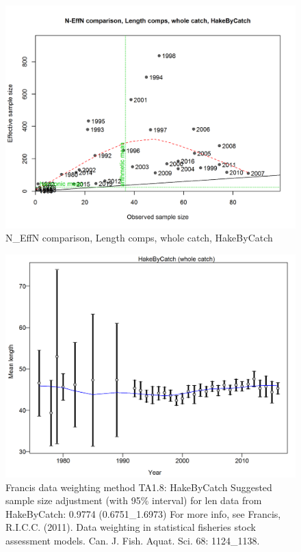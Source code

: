 \documentclass[12pt,]{article}
\begin{document}
\begin{figure}[htbp]
\centering
\includegraphics{./r4ss/plots_mod1/comp_lenfit_sampsize_flt2mkt0.png}
\caption{N\_EffN comparison, Length comps, whole catch, HakeByCatch
\label{fig:mod1_12_comp_lenfit_sampsize_flt2mkt0}}
\end{figure}

\begin{figure}[htbp]
\centering
\includegraphics{./r4ss/plots_mod1/comp_lenfit_data_weighting_TA1.8_HakeByCatch.png}
\caption{Francis data weighting method TA1.8: HakeByCatch Suggested
sample size adjustment (with 95\% interval) for len data from
HakeByCatch: 0.9774 (0.6751\_1.6973) For more info, see Francis,
R.I.C.C. (2011). Data weighting in statistical fisheries stock
assessment models. Can. J. Fish. Aquat. Sci. 68: 1124\_1138.
\label{fig:mod1_13_comp_lenfit_data_weighting_TA1.8_HakeByCatch}}
\end{figure}
\end{document}

